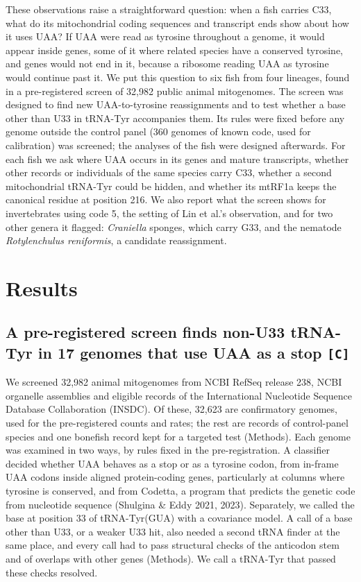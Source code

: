 \documentclass[11pt, a4paper]{article}
\begin{document}
These observations raise a straightforward question: when a fish carries C33, what do its mitochondrial coding sequences and transcript ends show about how it uses UAA? If UAA were read as tyrosine throughout a genome, it would appear inside genes, some of it where related species have a conserved tyrosine, and genes would not end in it, because a ribosome reading UAA as tyrosine would continue past it. We put this question to six fish from four lineages, found in a pre-registered screen of 32,982 public animal mitogenomes. The screen was designed to find new UAA-to-tyrosine reassignments and to test whether a base other than U33 in tRNA-Tyr accompanies them. Its rules were fixed before any genome outside the control panel (360 genomes of known code, used for calibration) was screened; the analyses of the fish were designed afterwards. For each fish we ask where UAA occurs in its genes and mature transcripts, whether other records or individuals of the same species carry C33, whether a second mitochondrial tRNA-Tyr could be hidden, and whether its mtRF1a keeps the canonical residue at position 216. We also report what the screen shows for invertebrates using code 5, the setting of Lin et al.'s observation, and for two other genera it flagged: \textit{Craniella} sponges, which carry G33, and the nematode \textit{Rotylenchulus reniformis}, a candidate reassignment.

\section{Results}

\subsection{A pre-registered screen finds non-U33 tRNA-Tyr in 17 genomes that use UAA as a stop \texttt{[C]}}\label{sec:screen}
We screened 32,982 animal mitogenomes from NCBI RefSeq release 238, NCBI organelle assemblies and eligible records of the International Nucleotide Sequence Database Collaboration (INSDC). Of these, 32,623 are confirmatory genomes, used for the pre-registered counts and rates; the rest are records of control-panel species and one bonefish record kept for a targeted test (Methods). Each genome was examined in two ways, by rules fixed in the pre-registration. A classifier decided whether UAA behaves as a stop or as a tyrosine codon, from in-frame UAA codons inside aligned protein-coding genes, particularly at columns where tyrosine is conserved, and from Codetta, a program that predicts the genetic code from nucleotide sequence (Shulgina \& Eddy 2021, 2023). Separately, we called the base at position 33 of tRNA-Tyr(GUA) with a covariance model. A call of a base other than U33, or a weaker U33 hit, also needed a second tRNA finder at the same place, and every call had to pass structural checks of the anticodon stem and of overlaps with other genes (Methods). We call a tRNA-Tyr that passed these checks resolved.
\end{document}
